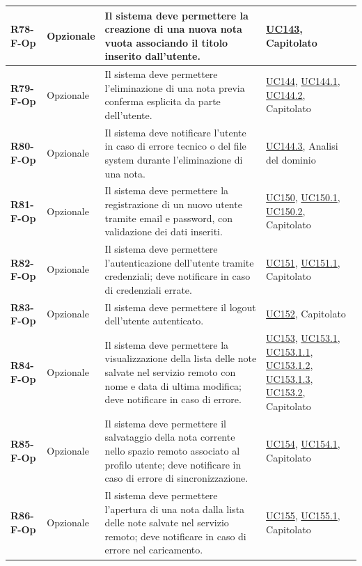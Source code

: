 \begin{longtable}{|p{2.5cm}|p{2.2cm}|p{6.8cm}|p{2.7cm}|}
	\textbf{R78-F-Op} & Opzionale & Il sistema deve permettere la creazione di una nuova nota vuota associando il titolo inserito dall'utente. & \hyperlink{uc143}{UC143}, Capitolato \\ \hline
	\textbf{R79-F-Op} & Opzionale & Il sistema deve permettere l'eliminazione di una nota previa conferma esplicita da parte dell'utente. & \hyperlink{uc144}{UC144}, \hyperlink{uc144.1}{UC144.1}, \hyperlink{uc144.2}{UC144.2}, Capitolato \\ \hline
	\textbf{R80-F-Op} & Opzionale & Il sistema deve notificare l'utente in caso di errore tecnico o del file system durante l'eliminazione di una nota. & \hyperlink{uc144.3}{UC144.3}, Analisi del dominio \\ \hline
	\textbf{R81-F-Op} & Opzionale & Il sistema deve permettere la registrazione di un nuovo utente tramite email e password, con validazione dei dati inseriti. & \hyperlink{uc150}{UC150}, \hyperlink{uc150.1}{UC150.1}, \hyperlink{uc150.2}{UC150.2}, Capitolato \\ \hline
	\textbf{R82-F-Op} & Opzionale & Il sistema deve permettere l'autenticazione dell'utente tramite credenziali; deve notificare in caso di credenziali errate. & \hyperlink{uc151}{UC151}, \hyperlink{uc151.1}{UC151.1}, Capitolato \\ \hline
	\textbf{R83-F-Op} & Opzionale & Il sistema deve permettere il logout dell'utente autenticato. & \hyperlink{uc152}{UC152}, Capitolato \\ \hline
	\textbf{R84-F-Op} & Opzionale & Il sistema deve permettere la visualizzazione della lista delle note salvate nel servizio remoto con nome e data di ultima modifica; deve notificare in caso di errore. & \hyperlink{uc153}{UC153}, \hyperlink{uc153.1}{UC153.1}, \hyperlink{uc153.1.1}{UC153.1.1}, \hyperlink{uc153.1.2}{UC153.1.2}, \hyperlink{uc153.1.3}{UC153.1.3}, \hyperlink{uc153.2}{UC153.2}, Capitolato \\ \hline
	\textbf{R85-F-Op} & Opzionale & Il sistema deve permettere il salvataggio della nota corrente nello spazio remoto associato al profilo utente; deve notificare in caso di errore di sincronizzazione. & \hyperlink{uc154}{UC154}, \hyperlink{uc154.1}{UC154.1}, Capitolato \\ \hline
	\textbf{R86-F-Op} & Opzionale & Il sistema deve permettere l'apertura di una nota dalla lista delle note salvate nel servizio remoto; deve notificare in caso di errore nel caricamento. & \hyperlink{uc155}{UC155}, \hyperlink{uc155.1}{UC155.1}, Capitolato \\ \hline


\end{longtable}
